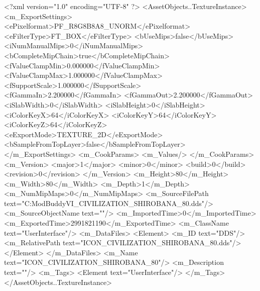 <?xml version="1.0" encoding="UTF-8" ?>
<AssetObjects..TextureInstance>
	<m_ExportSettings>
		<ePixelformat>PF_R8G8B8A8_UNORM</ePixelformat>
		<eFilterType>FT_BOX</eFilterType>
		<bUseMips>false</bUseMips>
		<iNumManualMips>0</iNumManualMips>
		<bCompleteMipChain>true</bCompleteMipChain>
		<fValueClampMin>0.000000</fValueClampMin>
		<fValueClampMax>1.000000</fValueClampMax>
		<fSupportScale>1.000000</fSupportScale>
		<fGammaIn>2.200000</fGammaIn>
		<fGammaOut>2.200000</fGammaOut>
		<iSlabWidth>0</iSlabWidth>
		<iSlabHeight>0</iSlabHeight>
		<iColorKeyX>64</iColorKeyX>
		<iColorKeyY>64</iColorKeyY>
		<iColorKeyZ>64</iColorKeyZ>
		<eExportMode>TEXTURE_2D</eExportMode>
		<bSampleFromTopLayer>false</bSampleFromTopLayer>
	</m_ExportSettings>
	<m_CookParams>
		<m_Values/>
	</m_CookParams>
	<m_Version>
		<major>1</major>
		<minor>0</minor>
		<build>0</build>
		<revision>0</revision>
	</m_Version>
	<m_Height>80</m_Height>
	<m_Width>80</m_Width>
	<m_Depth>1</m_Depth>
	<m_NumMipMaps>0</m_NumMipMaps>
	<m_SourceFilePath text="C:\Users\asus\Documents\Firaxis ModBuddy\Civilization VI\temppic\ICON_CIVILIZATION_SHIROBANA_80.dds"/>
	<m_SourceObjectName text=""/>
	<m_ImportedTime>0</m_ImportedTime>
	<m_ExportedTime>2991821190</m_ExportedTime>
	<m_ClassName text="UserInterface"/>
	<m_DataFiles>
		<Element>
			<m_ID text="DDS"/>
			<m_RelativePath text="ICON_CIVILIZATION_SHIROBANA_80.dds"/>
		</Element>
	</m_DataFiles>
	<m_Name text="ICON_CIVILIZATION_SHIROBANA_80"/>
	<m_Description text=""/>
	<m_Tags>
		<Element text="UserInterface"/>
	</m_Tags>
</AssetObjects..TextureInstance>

